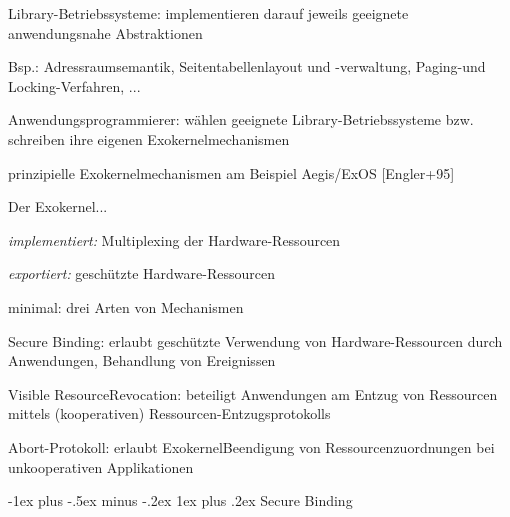\documentclass[a4paper]{article}
\makeatletter
\renewcommand{\subsubsection}{\@startsection{subsubsection}{3}{0mm}%
 {-1ex plus -.5ex minus -.2ex}%
 {1ex plus .2ex}%
 {\normalfont\small\bfseries}}
\makeatother
\begin{document}
\begin{multicols}{3}
\begin{itemize*}
\begin{itemize*}
            \item Library-Betriebssysteme: implementieren darauf jeweils geeignete anwendungsnahe Abstraktionen \begin{itemize*} \item Bsp.: Adressraumsemantik, Seitentabellenlayout und -verwaltung, Paging-und Locking-Verfahren, ... \end{itemize*}
            \item Anwendungsprogrammierer: wählen geeignete Library-Betriebssysteme bzw. schreiben ihre eigenen Exokernelmechanismen
        \end{itemize*}
        \item prinzipielle Exokernelmechanismen am Beispiel Aegis/ExOS
        [Engler+95]
        \begin{itemize*}
            \item Der Exokernel... \begin{itemize*} \item \emph{implementiert:} Multiplexing der Hardware-Ressourcen \item \emph{exportiert:} geschützte Hardware-Ressourcen \end{itemize*}
        \end{itemize*}
        \item minimal: drei Arten von Mechanismen
        \begin{enumerate*}

            \item Secure Binding: erlaubt geschützte Verwendung von Hardware-Ressourcen durch Anwendungen, Behandlung von Ereignissen
            \item Visible ResourceRevocation: beteiligt Anwendungen am Entzug von Ressourcen mittels (kooperativen) Ressourcen-Entzugsprotokolls
            \item Abort-Protokoll: erlaubt ExokernelBeendigung von Ressourcenzuordnungen bei unkooperativen Applikationen
        \end{enumerate*}
    \end{itemize*}


    \subsubsection{Secure Binding}


\end{multicols}
\end{document}
